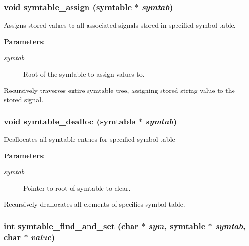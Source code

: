 \subsubsection{\setlength{\rightskip}{0pt plus 5cm}void symtable\_\-assign ({\bf symtable} $\ast$ {\em symtab})}\label{symtable_8h_a3}


Assigns stored values to all associated signals stored in specified symbol table.

\begin{Desc}
\item[{\bf Parameters: }]\par
\begin{description}
\item[
{\em symtab}]Root of the symtable to assign values to.

\end{description}
\end{Desc}
Recursively traverses entire symtable tree, assigning stored string value to the stored signal. 
\subsubsection{\setlength{\rightskip}{0pt plus 5cm}void symtable\_\-dealloc ({\bf symtable} $\ast$ {\em symtab})}\label{symtable_8h_a4}


Deallocates all symtable entries for specified symbol table.

\begin{Desc}
\item[{\bf Parameters: }]\par
\begin{description}
\item[
{\em symtab}]Pointer to root of symtable to clear.

\end{description}
\end{Desc}
Recursively deallocates all elements of specifies symbol table. 
\subsubsection{\setlength{\rightskip}{0pt plus 5cm}int symtable\_\-find\_\-and\_\-set (char $\ast$ {\em sym}, {\bf symtable} $\ast$ {\em symtab}, char $\ast$ {\em value})}\label{symtable_8h_a1}


